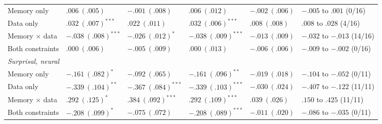 \begin{table}[t]
{\begin{tabular}{llllll}
Memory only & $.006\ (.005)$ & $-.001\ (.008)$ & $.006\ (.012)$ & $-.002\ (.006)$ & $-.005$ to $.001$ (0/16) \\
Data only & $.032\ (.007)^{***}$ & $.022\ (.011)$ & $.032\ (.006)^{***}$ & $.008\ (.008)$ & $.008$ to $.028$ (4/16) \\
Memory $\times$ data & $-.038\ (.008)^{***}$ & $-.026\ (.012)^{*}$ & $-.038\ (.009)^{***}$ & $-.013\ (.009)$ & $-.032$ to $-.013$ (14/16) \\
Both constraints & $.000\ (.006)$ & $-.005\ (.009)$ & $.000\ (.013)$ & $-.006\ (.006)$ & $-.009$ to $-.002$ (0/16) \\
\multicolumn{6}{l}{\textit{Surprisal, neural}} \\
Memory only & $-.161\ (.082)^{*}$ & $-.092\ (.065)$ & $-.161\ (.096)^{**}$ & $-.019\ (.018)$ & $-.104$ to $-.052$ (0/11) \\
Data only & $-.339\ (.104)^{**}$ & $-.367\ (.084)^{***}$ & $-.339\ (.103)^{***}$ & $-.030\ (.024)$ & $-.407$ to $-.122$ (11/11) \\
Memory $\times$ data & $.292\ (.125)^{*}$ & $.384\ (.092)^{***}$ & $.292\ (.109)^{***}$ & $.039\ (.026)$ & $.150$ to $.425$ (11/11) \\
Both constraints & $-.208\ (.099)^{*}$ & $-.075\ (.072)$ & $-.208\ (.089)^{***}$ & $-.011\ (.020)$ & $-.086$ to $-.035$ (0/11) \\
\bottomrule
\end{tabular}}
\end{table}
